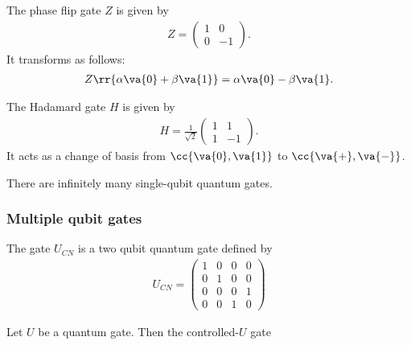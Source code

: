 \documentclass{article}
\begin{document}
\begin{definition}
  \label{def:phase-flip}
  The phase flip gate $Z$ is given by
  \begin{align*}
    Z = \begin{pmatrix} 1 & 0 \\ 0 & -1 \end{pmatrix}.
  \end{align*}
  It transforms as follows:
  \begin{align*}
    Z \rr{\alpha\va{0} + \beta\va{1}} = \alpha\va{0} - \beta\va{1}.
  \end{align*}
\end{definition}


\begin{definition}
  \label{def:hadamard}
  The Hadamard gate $H$ is given by
  \begin{align*}
    H = \frac{1}{\sqrt{2}} \begin{pmatrix} 1 & 1 \\ 1 & -1 \end{pmatrix}.
  \end{align*}
  It acts as a change of basis from $ \cc{ \va{ 0 }, \va{ 1 } } $ to $ \cc{ \va{ + }, \va{ - } }$.
\end{definition}

\begin{theorem}
  \label{thm:infinite-gates}
  There are infinitely many single-qubit quantum gates.
\end{theorem}

\subsubsection{Multiple qubit gates}
\label{sec:multiple-qubit-gates}

\begin{definition}
  \label{def:cnot}
  The  gate $U_{CN}$ is a two qubit quantum gate defined by
  \begin{align*}
    U_{CN} = \begin{pmatrix}
      1 & 0 & 0 & 0 \\
      0 & 1 & 0 & 0 \\
      0 & 0 & 0 & 1 \\
      0 & 0 & 1 & 0
    \end{pmatrix}
  \end{align*}
\end{definition}

\begin{definition}
  \label{def:controlled-u}
  Let $U$ be a quantum gate. Then the controlled-$U$ gate
\end{definition}
\end{document}
